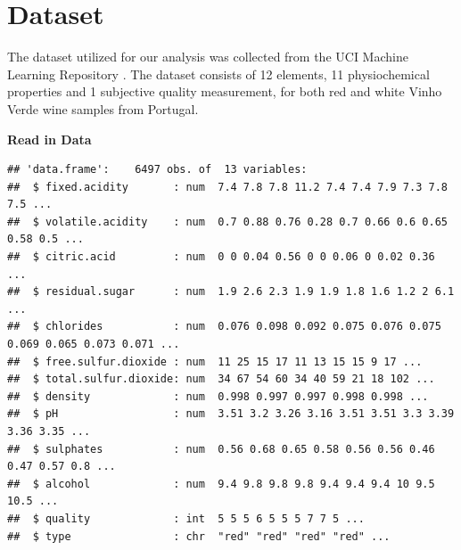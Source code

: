 \documentclass[
]{book}
\newenvironment{Shaded}{\begin{snugshade}}{\end{snugshade}}
\newcommand{\AttributeTok}[1]{\textcolor[rgb]{0.77,0.63,0.00}{#1}}
\newcommand{\CommentTok}[1]{\textcolor[rgb]{0.56,0.35,0.01}{\textit{#1}}}
\newcommand{\ConstantTok}[1]{\textcolor[rgb]{0.00,0.00,0.00}{#1}}
\newcommand{\FunctionTok}[1]{\textcolor[rgb]{0.00,0.00,0.00}{#1}}
\newcommand{\NormalTok}[1]{#1}
\newcommand{\OtherTok}[1]{\textcolor[rgb]{0.56,0.35,0.01}{#1}}
\newcommand{\SpecialCharTok}[1]{\textcolor[rgb]{0.00,0.00,0.00}{#1}}
\newcommand{\StringTok}[1]{\textcolor[rgb]{0.31,0.60,0.02}{#1}}
\begin{document}
\hypertarget{dataset}{%
\section{Dataset}\label{dataset}}

The dataset utilized for our analysis was collected from the UCI Machine Learning Repository \citet{model_wine}. The dataset consists of 12 elements, 11 physiochemical properties and 1 subjective quality measurement, for both red and white Vinho Verde wine samples from Portugal.

\textbf{Read in Data}

\begin{Shaded}
\end{Shaded}

\begin{verbatim}
## 'data.frame':    6497 obs. of  13 variables:
##  $ fixed.acidity       : num  7.4 7.8 7.8 11.2 7.4 7.4 7.9 7.3 7.8 7.5 ...
##  $ volatile.acidity    : num  0.7 0.88 0.76 0.28 0.7 0.66 0.6 0.65 0.58 0.5 ...
##  $ citric.acid         : num  0 0 0.04 0.56 0 0 0.06 0 0.02 0.36 ...
##  $ residual.sugar      : num  1.9 2.6 2.3 1.9 1.9 1.8 1.6 1.2 2 6.1 ...
##  $ chlorides           : num  0.076 0.098 0.092 0.075 0.076 0.075 0.069 0.065 0.073 0.071 ...
##  $ free.sulfur.dioxide : num  11 25 15 17 11 13 15 15 9 17 ...
##  $ total.sulfur.dioxide: num  34 67 54 60 34 40 59 21 18 102 ...
##  $ density             : num  0.998 0.997 0.997 0.998 0.998 ...
##  $ pH                  : num  3.51 3.2 3.26 3.16 3.51 3.51 3.3 3.39 3.36 3.35 ...
##  $ sulphates           : num  0.56 0.68 0.65 0.58 0.56 0.56 0.46 0.47 0.57 0.8 ...
##  $ alcohol             : num  9.4 9.8 9.8 9.8 9.4 9.4 9.4 10 9.5 10.5 ...
##  $ quality             : int  5 5 5 6 5 5 5 7 7 5 ...
##  $ type                : chr  "red" "red" "red" "red" ...
\end{verbatim}
\end{document}
